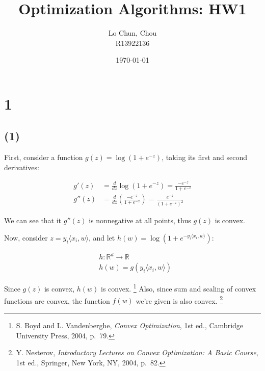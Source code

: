 \documentclass{article}
\title{Optimization Algorithms: HW1}
\author{Lo Chun, Chou \\ R13922136}
\date\today
\begin{document}
\setlength{\parindent}{0pt}
\maketitle 


\section*{1}

\subsection*{(1)}

First, consider a function $g(z) = \log(1 + e^{-z})$, taking its first and second derivatives:

\begin{align*}
    g'(z) &= \frac{d}{dz} \log(1 + e^{-z}) = \frac{-e^{-z}}{1 + e^{-z}} \\
    g''(z) &= \frac{d}{dz} \left( \frac{-e^{-z}}{1 + e^{-z}} \right) = \frac{e^{-z}}{(1 + e^{-z})^2}
\end{align*}

We can see that it $g''(z)$ is nonnegative at all points, thus $g(z)$ is convex.

Now, consider $z = y_i \langle x_i, w \rangle$, and let $h(w) = \log(1 + e^{-y_i \langle x_i, w \rangle})$:

\begin{align*}
    &h: \mathbb{R}^d \to \mathbb{R} \\
    &h(w) = g(y_i \langle x_i, w \rangle)
\end{align*}

Since $g(z)$ is convex, $h(w)$ is convex.
\footnote{S. Boyd and L. Vandenberghe, \textit{Convex Optimization}, 1st ed., Cambridge University Press, 2004, p.~79.}
Also, since sum and scaling of convex functions are convex, the function $f(w)$ we're given is also convex.
\footnote{Y. Nesterov, \textit{Introductory Lectures on Convex Optimization: A Basic Course}, 1st ed., Springer, New York, NY, 2004, p.~82.}
\bigskip
\end{document}
